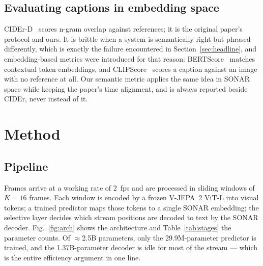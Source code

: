 \documentclass[journal]{IEEEtran}
\begin{document}
\subsection{Evaluating captions in embedding space}
CIDEr-D~\cite{cider2015} scores n-gram overlap against references; it is the
original paper's protocol and ours. It is brittle when a system is semantically
right but phrased differently, which is exactly the failure encountered in
Section~\ref{sec:headline}, and embedding-based metrics were introduced for that
reason: BERTScore~\cite{bertscore2020} matches contextual token embeddings, and
CLIPScore~\cite{clipscore2021} scores a caption against an image with no reference
at all. Our semantic metric applies the same idea in SONAR space while keeping the
paper's time alignment, and is always reported beside CIDEr, never instead of it.

\section{Method}
\label{sec:method}

\subsection{Pipeline}
Frames arrive at a working rate of 2~fps and are processed in sliding windows of
$K=16$ frames. Each window is encoded by a frozen V-JEPA~2 ViT-L into visual
tokens; a trained predictor maps those tokens to a single SONAR embedding; the
selective layer decides which stream positions are decoded to text by the SONAR
decoder. Fig.~\ref{fig:arch} shows the architecture and
Table~\ref{tab:stages} the parameter counts. Of $\approx$2.5B parameters, only the
29.9M-parameter predictor is trained, and the 1.37B-parameter decoder is idle for
most of the stream --- which is the entire efficiency argument in one line.
\end{document}
